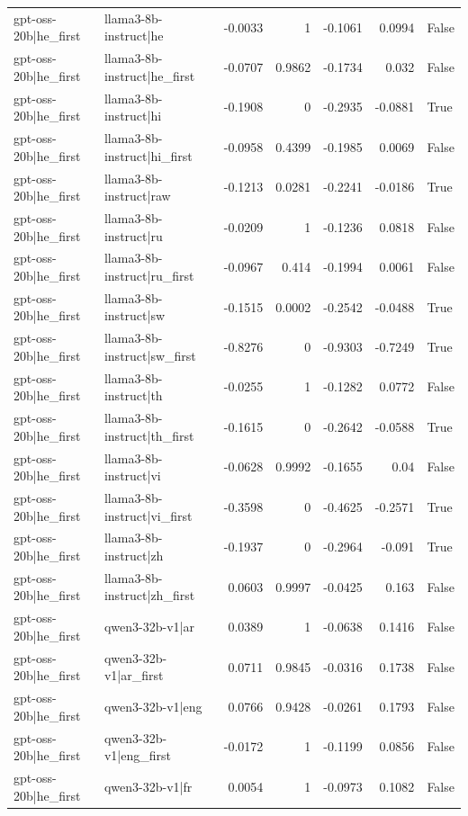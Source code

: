 \begin{table}
\begin{tabular}{l l r r r r l}
gpt-oss-20b|he_first & llama3-8b-instruct|he & -0.0033 & 1 & -0.1061 & 0.0994 & False \\
gpt-oss-20b|he_first & llama3-8b-instruct|he_first & -0.0707 & 0.9862 & -0.1734 & 0.032 & False \\
gpt-oss-20b|he_first & llama3-8b-instruct|hi & -0.1908 & 0 & -0.2935 & -0.0881 & True \\
gpt-oss-20b|he_first & llama3-8b-instruct|hi_first & -0.0958 & 0.4399 & -0.1985 & 0.0069 & False \\
gpt-oss-20b|he_first & llama3-8b-instruct|raw & -0.1213 & 0.0281 & -0.2241 & -0.0186 & True \\
gpt-oss-20b|he_first & llama3-8b-instruct|ru & -0.0209 & 1 & -0.1236 & 0.0818 & False \\
gpt-oss-20b|he_first & llama3-8b-instruct|ru_first & -0.0967 & 0.414 & -0.1994 & 0.0061 & False \\
gpt-oss-20b|he_first & llama3-8b-instruct|sw & -0.1515 & 0.0002 & -0.2542 & -0.0488 & True \\
gpt-oss-20b|he_first & llama3-8b-instruct|sw_first & -0.8276 & 0 & -0.9303 & -0.7249 & True \\
gpt-oss-20b|he_first & llama3-8b-instruct|th & -0.0255 & 1 & -0.1282 & 0.0772 & False \\
gpt-oss-20b|he_first & llama3-8b-instruct|th_first & -0.1615 & 0 & -0.2642 & -0.0588 & True \\
gpt-oss-20b|he_first & llama3-8b-instruct|vi & -0.0628 & 0.9992 & -0.1655 & 0.04 & False \\
gpt-oss-20b|he_first & llama3-8b-instruct|vi_first & -0.3598 & 0 & -0.4625 & -0.2571 & True \\
gpt-oss-20b|he_first & llama3-8b-instruct|zh & -0.1937 & 0 & -0.2964 & -0.091 & True \\
gpt-oss-20b|he_first & llama3-8b-instruct|zh_first & 0.0603 & 0.9997 & -0.0425 & 0.163 & False \\
gpt-oss-20b|he_first & qwen3-32b-v1|ar & 0.0389 & 1 & -0.0638 & 0.1416 & False \\
gpt-oss-20b|he_first & qwen3-32b-v1|ar_first & 0.0711 & 0.9845 & -0.0316 & 0.1738 & False \\
gpt-oss-20b|he_first & qwen3-32b-v1|eng & 0.0766 & 0.9428 & -0.0261 & 0.1793 & False \\
gpt-oss-20b|he_first & qwen3-32b-v1|eng_first & -0.0172 & 1 & -0.1199 & 0.0856 & False \\
gpt-oss-20b|he_first & qwen3-32b-v1|fr & 0.0054 & 1 & -0.0973 & 0.1082 & False \\

\end{tabular}
\end{table}
